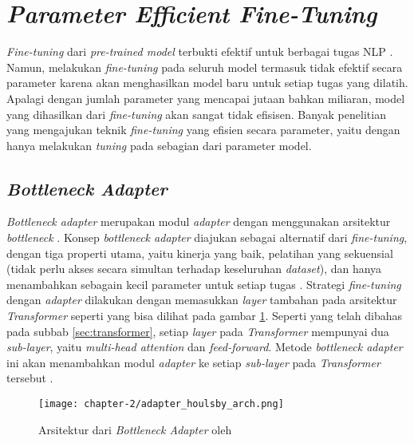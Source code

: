 \section{\textit{Parameter Efficient Fine-Tuning}}

\textit{Fine-tuning} dari \textit{pre-trained model} terbukti efektif untuk berbagai tugas NLP \parencite{fine_tuning}. Namun, melakukan \textit{fine-tuning} pada seluruh model termasuk tidak efektif secara parameter karena akan menghasilkan model baru untuk setiap tugas yang dilatih. Apalagi dengan jumlah parameter yang mencapai jutaan bahkan miliaran, model yang dihasilkan dari \textit{fine-tuning} akan sangat tidak efisisen. Banyak penelitian yang mengajukan teknik \textit{fine-tuning} yang efisien secara parameter, yaitu \PEFT dengan hanya melakukan \textit{tuning} pada sebagian dari parameter model.

\subsection{\textit{Bottleneck Adapter}}

\textit{Bottleneck adapter} merupakan modul \textit{adapter} dengan menggunakan arsitektur \textit{bottleneck} \parencite{adapter_houlsby}. Konsep \textit{bottleneck adapter} diajukan sebagai alternatif dari \textit{fine-tuning}, dengan tiga properti utama, yaitu kinerja yang baik, pelatihan yang sekuensial (tidak perlu akses secara simultan terhadap keseluruhan \textit{dataset}), dan hanya menambahkan sebagain kecil parameter untuk setiap tugas \parencite{adapter_houlsby}. Strategi \textit{fine-tuning} dengan \textit{adapter} dilakukan dengan memasukkan \textit{layer} tambahan pada arsitektur \textit{Transformer} seperti yang bisa dilihat pada gambar \ref{fig:adapters_houlsby_arch}. Seperti yang telah dibahas pada subbab \ref{sec:transformer}, setiap \textit{layer} pada \textit{Transformer} mempunyai dua \textit{sub-layer}, yaitu \textit{multi-head attention} dan \textit{feed-forward}. Metode \textit{bottleneck adapter} ini akan menambahkan modul \textit{adapter} ke setiap \textit{sub-layer} pada \textit{Transformer} tersebut \parencite{adapter_houlsby}.

\begin{figure}[h]
    \vspace{0.25cm}
    \centering
    \texttt{[image: chapter-2/adapter\_houlsby\_arch.png]}
    \caption{Arsitektur dari \textit{Bottleneck Adapter} oleh \citeauthor{adapter_houlsby} \parencite{adapter_houlsby}}
    \label{fig:adapters_houlsby_arch}
\end{figure}

